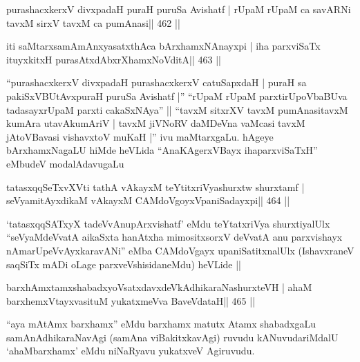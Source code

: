 

\begin{shl}
purashacxkerxV divxpadaH puraH puruSa Avishatf |
rUpaM rUpaM ca savARNi tavxM sirxV tavxM ca pumAnasi\hfill || 462 ||
\end{shl}

\begin{shl}
iti saMtarxsamAmAnxyasatxthAca bArxhamxNAnayxpi |
iha parxviSaTx ituyxkitxH purasAtxdAbxrXhamxNoVditA\hfill || 463 ||
\end{shl}

\begin{artha}
``purashacxkerxV divxpadaH purashacxkerxV catuSapxdaH | puraH sa
  pakiSxVBUtAvxpuraH puruSa Avishatf |'' ``rUpaM rUpaM
  parxtirUpoVbaBUva tadasayxrUpaM parxti cakaSxNAya'' ||  ``tavxM
  sitxrXV tavxM pumAnasitavxM kumAra utavAkumAriV | tavxM jiVNoRV
  daMDeVna vaMcasi tavxM jAtoVBavasi vishavxtoV muKaH |'' ivu
  maMtarxgaLu. hAgeye bArxhamxNagaLU hiMde heVLida ``AnaKAgerxVBayx
  ihaparxviSaTxH'' eMbudeV modalAdavugaLu 
\end{artha}

\begin{shl}
tatasxqqSeTxvXVti tathA vAkayxM teYtitxriVyashurxtw shurxtamf |
seVyamitAyxdikaM vAkayxM CAMdoVgoyxVpaniSadayxpi\hfill || 464 ||
\end{shl}

\begin{artha}
`tatasxqqSATxyX tadeVvAnupArxvishatf' eMdu teYtatxriVya shurxtiyalUlx
  ``seVyaMdeVvatA aikaSxta hanAtxha mimositxsorxV deVvatA anu
  parxvishayx nAmarUpeVvAyxkaravANi'' eMba CAMdoVgayx
  upaniSatitxnalUlx (IshavxraneV saqSiTx mADi oLage
  parxveVshisidaneMdu) heVLide || 
\end{artha}



\begin{shl}
barxhAmxtamxshabadxyoVsatxdavxdeVkAdhikaraNashurxteVH |
ahaM barxhemxVtayxvasituM yukatxmeVva BaveVdataH\hfill || 465 ||
\end{shl}

\begin{artha}
``aya mAtAmx barxhamx'' eMdu barxhamx matutx Atamx shabadxgaLu   samAnAdhikaraNavAgi (samAna viBakitxkavAgi) ruvudu kANuvudariMdalU   `ahaMbarxhamx' eMdu niNaRyavu yukatxveV Agiruvudu.
\end{artha}

